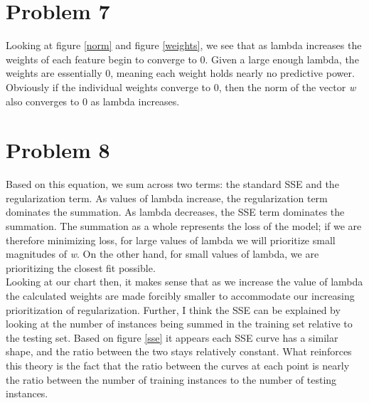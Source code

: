 \documentclass[journal]{IEEEtran}
\begin{document}
\section{Problem 7}
\noindent Looking at figure \ref{norm} and figure \ref{weights}, we see that as lambda increases 
the weights of each feature begin to converge to 0. Given a large enough lambda, 
the weights are essentially 0, meaning each weight holds nearly no predictive power.
Obviously if the individual weights converge to 0, then the norm of the vector
\textit{w} also converges to 0 as lambda increases.
\newline
\medskip

\section{Problem 8}
\noindent Based on this equation, we sum across two terms: the standard SSE
and the regularization term. As values of lambda increase, the regularization
term dominates the summation. As lambda decreases, the SSE term dominates the
summation. The summation as a whole represents the loss of the model; if we
are therefore minimizing loss, for large values of lambda we will prioritize
small magnitudes of \textit{w}. On the other hand, for small values of lambda,
we are prioritizing the closest fit possible. \\

\noindent Looking at our chart then, it makes sense that as we increase the
value of lambda the calculated weights are made forcibly smaller to accommodate
our increasing prioritization of regularization. Further, I think the SSE can
be explained by looking at the number of instances being summed in the training
set relative to the testing set. Based on figure \ref{sse} it appears each SSE
curve has a similar shape, and the ratio between the two stays relatively constant.
What reinforces this theory is the fact that the ratio between the curves at each
point is nearly the ratio between the number of training instances to the number
of testing instances.
\newline
\medskip

 
\end{document}
